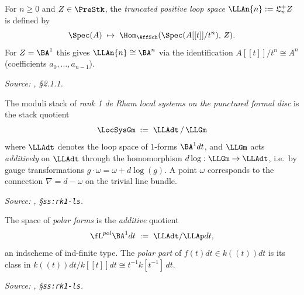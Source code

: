 \begin{definition}
  \label{def:truncated-positive-loop-space}
  For $n \geq 0$ and $Z \in \PreStk$, the \emph{truncated positive loop space}
  $\LLAn{n} := \mathfrak{L}_n^+ Z$ is defined by
  \[
    \Spec(A) \;\mapsto\; \Hom_{\AffSch}(\Spec(A[[t]]/t^n),\, Z).
  \]
  For $Z = \BA^1$ this gives $\LLAn{n} \cong \BA^n$ via the identification
  $A[[t]]/t^n \cong A^n$ (coefficients $a_0,\ldots,a_{n-1}$).

  \textit{Source: \cite{hilburn-raskin}, \S2.1.1.}
\end{definition}

\begin{definition}
  \label{def:locsys-gm}
  The moduli stack of \emph{rank 1 de Rham local systems on the punctured
  formal disc} is the stack quotient
  \[
    \LocSysGm \;:=\; \LLAdt \,/\, \LLGm
  \]
  where $\LLAdt$ denotes the loop space of $1$-forms $\BA^1 dt$, and $\LLGm$
  acts \emph{additively} on $\LLAdt$ through the homomorphism
  $d\log : \LLGm \to \LLAdt$, i.e.\ by gauge transformations
  $g \cdot \omega = \omega + d\log(g)$. A point $\omega$ corresponds to the
  connection $\nabla = d - \omega$ on the trivial line bundle.

  \textit{Source: \cite{hilburn-raskin}, \S\texttt{ss:rk1-ls}.}
\end{definition}

\begin{definition}
  \label{def:polar-forms}
  The space of \emph{polar forms} is the \emph{additive} quotient
  \[
    \fL^{pol}\BA^1 dt \;:=\; \LLAdt / \LLAp dt,
  \]
  an indscheme of ind-finite type. The \emph{polar part} of
  $f(t)dt \in k((t))dt$ is its class in
  $k((t))dt / k[[t]]dt \cong t^{-1}k[t^{-1}]\,dt$.

  \textit{Source: \cite{hilburn-raskin}, \S\texttt{ss:rk1-ls}.}
\end{definition}


